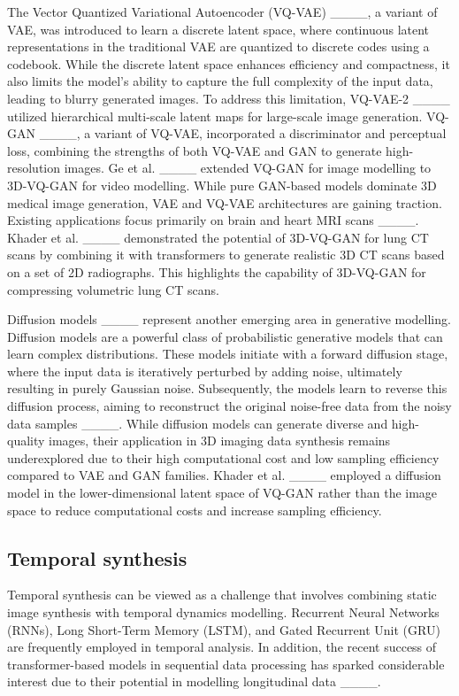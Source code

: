 The Vector Quantized Variational Autoencoder (VQ-VAE) ____, a variant of VAE, was introduced to learn a discrete latent space, where continuous latent representations in the traditional VAE are quantized to discrete codes using a codebook. While the discrete latent space enhances efficiency and compactness, it also limits the model's ability to capture the full complexity of the input data, leading to blurry generated images. To address this limitation, VQ-VAE-2 ____ utilized hierarchical multi-scale latent maps for large-scale image generation. VQ-GAN ____, a variant of VQ-VAE, incorporated a discriminator and perceptual loss, combining the strengths of both VQ-VAE and GAN to generate high-resolution images. Ge et al. ____ extended VQ-GAN for image modelling to 3D-VQ-GAN for video modelling. While pure GAN-based models dominate 3D medical image generation, VAE and VQ-VAE architectures are gaining traction. Existing applications focus primarily on brain and heart MRI scans ____. Khader et al. ____ demonstrated the potential of 3D-VQ-GAN for lung CT scans by combining it with transformers to generate realistic 3D CT scans based on a set of 2D radiographs. This highlights the capability of 3D-VQ-GAN for compressing volumetric lung CT scans.

Diffusion models ____ represent another emerging area in generative modelling. Diffusion models are a powerful class of probabilistic generative models that can learn complex distributions. These models initiate with a forward diffusion stage, where the input data is iteratively perturbed by adding noise, ultimately resulting in purely Gaussian noise. Subsequently, the models learn to reverse this diffusion process, aiming to reconstruct the original noise-free data from the noisy data samples ____. While diffusion models can generate diverse and high-quality images, their application in 3D imaging data synthesis remains underexplored due to their high computational cost and low sampling efficiency compared to VAE and GAN families. Khader et al. ____ employed a diffusion model in the lower-dimensional latent space of VQ-GAN rather than the image space to reduce computational costs and increase sampling efficiency.


\subsection{Temporal synthesis} 

Temporal synthesis can be viewed as a challenge that involves combining static image synthesis with temporal dynamics modelling. Recurrent Neural Networks (RNNs), Long Short-Term Memory (LSTM), and Gated Recurrent Unit (GRU) are frequently employed in temporal analysis. In addition, the recent success of transformer-based models in sequential data processing has sparked considerable interest due to their potential in modelling longitudinal data ____.


